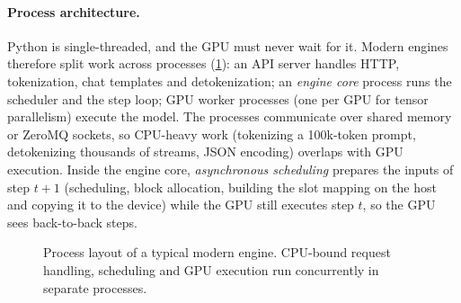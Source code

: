 \paragraph{Process architecture.} Python is single-threaded, and the GPU must never wait for it. Modern
engines therefore split work across processes (\cref{fig:serving:procs}): an API server handles HTTP,
tokenization, chat templates and detokenization; an \emph{engine core} process runs the scheduler and
the step loop; GPU worker processes (one per GPU for tensor parallelism) execute the model. The
processes communicate over shared memory or ZeroMQ sockets, so CPU-heavy work (tokenizing a 100k-token
prompt, detokenizing thousands of streams, JSON encoding) overlaps with GPU execution. Inside the
engine core, \emph{asynchronous scheduling} prepares the inputs of step $t+1$ (scheduling, block
allocation, building the slot mapping on the host and copying it to the device) while the GPU still
executes step $t$, so the GPU sees back-to-back steps.

\begin{figure}[ht]
\centering
{}
\caption{Process layout of a typical modern engine. CPU-bound request handling, scheduling and GPU
execution run concurrently in separate processes.}
\label{fig:serving:procs}
\end{figure}

